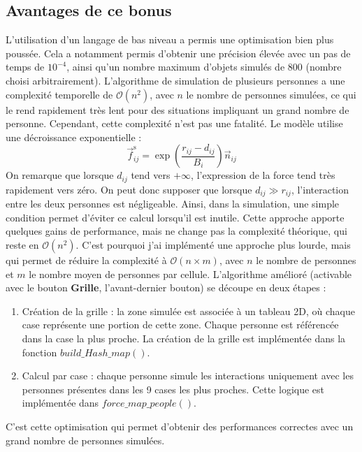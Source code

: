 \documentclass[a4paper,12pt]{article}
\begin{document}
\subsection{Avantages de ce bonus}
L'utilisation d'un langage de bas niveau a permis une optimisation bien plus poussée. Cela a notamment permis d'obtenir une précision élevée avec un pas de temps de $10^{-4}$, ainsi qu'un nombre maximum d'objets simulés de 800 (nombre choisi arbitrairement). L'algorithme de simulation de plusieurs personnes a une complexité temporelle de $\mathcal{O}(n^2)$, avec $n$ le nombre de personnes simulées, ce qui le rend rapidement très lent pour des situations impliquant un grand nombre de personne. Cependant, cette complexité n'est pas une fatalité. 
Le modèle utilise une décroissance exponentielle :
\begin{equation}
\label{eq:force_sociale}
\vec{f}_{ij}^{\text{s}} = \exp\left(\frac{r_{ij} - d_{ij}}{B_i}\right) \vec{n}_{ij}
\end{equation}
On remarque que lorsque $d_{ij}$ tend vers $+\infty$, l'expression de la force tend très rapidement vers zéro. On peut donc supposer que lorsque $d_{ij} \gg r_{ij}$, l'interaction entre les deux personnes est négligeable. Ainsi, dans la simulation, une simple condition permet d'éviter ce calcul lorsqu'il est inutile. Cette approche apporte quelques gains de performance, mais ne change pas la complexité théorique, qui reste en $\mathcal{O}(n^2)$.
C'est pourquoi j'ai implémenté une approche plus lourde, mais qui permet de réduire la complexité à $\mathcal{O}(n \times m)$, avec $n$ le nombre de personnes et $m$ le nombre moyen de personnes par cellule. L'algorithme amélioré (activable avec le bouton \textbf{Grille}, l'avant-dernier bouton) se découpe en deux étapes :
\begin{enumerate}

\item Création de la grille : la zone simulée est associée à un tableau 2D, où chaque case représente une portion de cette zone. Chaque personne est référencée dans la case la plus proche. La création de la grille est implémentée dans la fonction $build\_Hash\_map()$.
\item Calcul par case : chaque personne simule les interactions uniquement avec les personnes présentes dans les 9 cases les plus proches. Cette logique est implémentée dans $force\_map\_people()$.
\end{enumerate}
C'est cette optimisation qui permet d'obtenir des performances correctes avec un grand nombre de personnes simulées.
\end{document}
